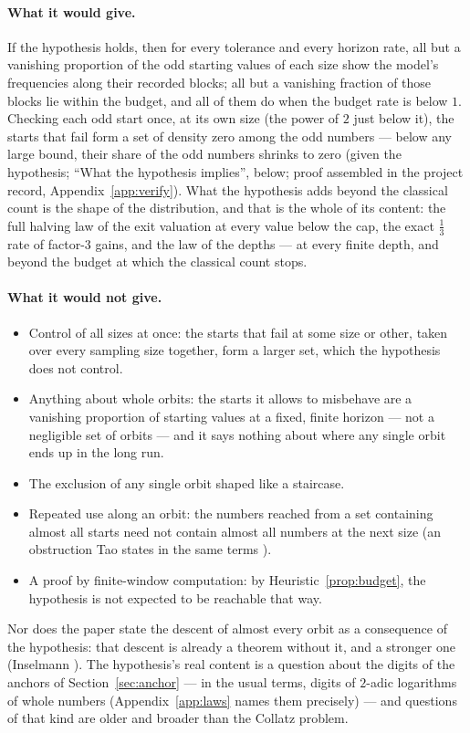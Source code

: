 \documentclass[11pt]{article}
\theoremstyle{remark}
\begin{document}
\paragraph{What it would give.} If the hypothesis holds, then for every tolerance and every horizon rate, all but a vanishing proportion of the odd starting values of each size show the model's frequencies along their recorded blocks; all but a vanishing fraction of those blocks lie within the budget, and all of them do when the budget rate is below $1$. Checking each odd start once, at its own size (the power of $2$ just below it), the starts that fail form a set of density zero among the odd numbers --- below any large bound, their share of the odd numbers shrinks to zero (given the hypothesis; ``What the hypothesis implies'', below; proof assembled in the project record, Appendix~\ref{app:verify}). What the hypothesis adds beyond the classical count is the shape of the distribution, and that is the whole of its content: the full halving law of the exit valuation at every value below the cap, the exact $\tfrac13$ rate of factor-$3$ gains, and the law of the depths --- at every finite depth, and beyond the budget at which the classical count stops.

\paragraph{What it would not give.}
\begin{itemize}
\item Control of all sizes at once: the starts that fail at some size or other, taken over every sampling size together, form a larger set, which the hypothesis does not control.
\item Anything about whole orbits: the starts it allows to misbehave are a vanishing proportion of starting values at a fixed, finite horizon --- not a negligible set of orbits --- and it says nothing about where any single orbit ends up in the long run.
\item The exclusion of any single orbit shaped like a staircase.
\item Repeated use along an orbit: the numbers reached from a set containing almost all starts need not contain almost all numbers at the next size (an obstruction Tao states in the same terms \cite{tao}).
\item A proof by finite-window computation: by Heuristic~\ref{prop:budget}, the hypothesis is not expected to be reachable that way.
\end{itemize}
Nor does the paper state the descent of almost every orbit as a consequence of the hypothesis: that descent is already a theorem without it, and a stronger one (Inselmann \cite{inselmann}). The hypothesis's real content is a question about the digits of the anchors of Section~\ref{sec:anchor} --- in the usual terms, digits of $2$-adic logarithms of whole numbers (Appendix~\ref{app:laws} names them precisely) --- and questions of that kind are older and broader than the Collatz problem.
\end{document}
